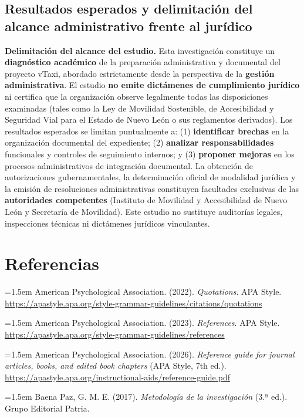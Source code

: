 {\subsection{Resultados esperados y delimitación del alcance administrativo frente al jurídico}
\textbf{Delimitación del alcance del estudio.} Esta investigación constituye un \textbf{diagnóstico académico} de la preparación administrativa y documental del proyecto vTaxi, abordado estrictamente desde la perspectiva de la \textbf{gestión administrativa}. El estudio \textbf{no emite dictámenes de cumplimiento jurídico} ni certifica que la organización observe legalmente todas las disposiciones examinadas (tales como la Ley de Movilidad Sostenible, de Accesibilidad y Seguridad Vial para el Estado de Nuevo León o sus reglamentos derivados). Los resultados esperados se limitan puntualmente a: (1) \textbf{identificar brechas} en la organización documental del expediente; (2) \textbf{analizar responsabilidades} funcionales y controles de seguimiento internos; y (3) \textbf{proponer mejoras} en los procesos administrativos de integración documental. La obtención de autorizaciones gubernamentales, la determinación oficial de modalidad jurídica y la emisión de resoluciones administrativas constituyen facultades exclusivas de las \textbf{autoridades competentes} (Instituto de Movilidad y Accesibilidad de Nuevo León y Secretaría de Movilidad). Este estudio no sustituye auditorías legales, inspecciones técnicas ni dictámenes jurídicos vinculantes.

\clearpage\section*{Referencias}
\begingroup\small
\setlength{\parindent}{0pt}
\setlength{\parskip}{4pt}
\hangindent=1.5em American Psychological Association. (2022). \textit{Quotations}. APA Style. \url{https://apastyle.apa.org/style-grammar-guidelines/citations/quotations}

\hangindent=1.5em American Psychological Association. (2023). \textit{References}. APA Style. \url{https://apastyle.apa.org/style-grammar-guidelines/references}

\hangindent=1.5em American Psychological Association. (2026). \textit{Reference guide for journal articles, books, and edited book chapters} (APA Style, 7th ed.). \url{https://apastyle.apa.org/instructional-aids/reference-guide.pdf}

\hangindent=1.5em Baena Paz, G. M. E. (2017). \textit{Metodología de la investigación} (3.ª ed.). Grupo Editorial Patria.

}
